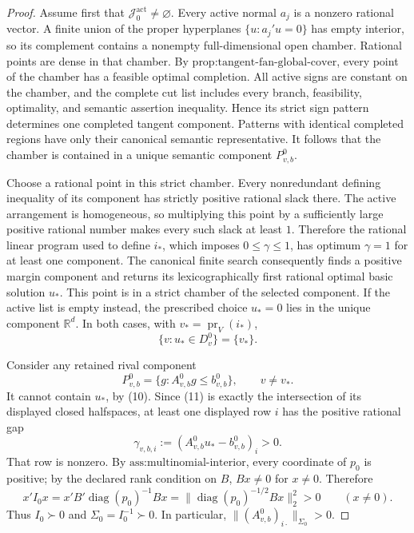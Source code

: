\documentclass{article}
\begin{document}
\begin{proof}
Assume first that
\(\mathcal J_0^{\mathrm{act}}\ne\varnothing\).  Every active normal
\(a_j\) is a nonzero rational vector.  A finite union of the proper
hyperplanes \(\{u:a_j'u=0\}\) has empty interior, so its complement
contains a nonempty full-dimensional open chamber.  Rational points
are dense in that chamber.  By
\(\text{prop:tangent-fan-global-cover}\), every point of the chamber
has a feasible optimal completion.  All active signs are constant on
the chamber, and the complete cut list includes every branch,
feasibility, optimality, and semantic assertion inequality.  Hence its
strict sign pattern determines one completed tangent component.
Patterns with identical completed regions have only their canonical
semantic representative.  It follows that the chamber is contained
in a unique semantic component \(P_{v,b}^0\).

Choose a rational point in this strict chamber.  Every nonredundant
defining inequality of its component has strictly positive rational
slack there.  The active arrangement is homogeneous, so multiplying
this point by a sufficiently large positive rational number makes
every such slack at least \(1\).  Therefore the rational linear
program used to define \(i_*\), which imposes
\(0\leq\gamma\leq1\), has optimum \(\gamma=1\) for at least one
component.  The canonical finite search consequently finds a positive
margin component and returns its lexicographically first rational
optimal basic solution \(u_*\).  This point is in a strict chamber of
the selected component.  If the active list is empty instead, the
prescribed choice \(u_*=0\) lies in the unique component
\(\mathbb R^d\).  In both cases, with
\(v_*=\operatorname{pr}_V(i_*)\),
\[
 \{v:u_*\in D_v^0\}=\{v_*\}.
\tag{10}
\]

Consider any retained rival component
\[
 P_{v,b}^0=\{g:A_{v,b}^0g\leq b_{v,b}^0\},
 \qquad v\ne v_*.
\tag{11}
\]
It cannot contain \(u_*\), by (10).  Since (11) is exactly the
intersection of its displayed closed halfspaces, at least one
displayed row \(i\) has the positive rational gap
\[
 \gamma_{v,b,i}
 :=(A_{v,b}^0u_*-b_{v,b}^0)_i>0.
\tag{12}
\]
That row is nonzero.  By \(\text{ass:multinomial-interior}\), every
coordinate of \(p_0\) is positive; by the declared rank condition on
\(B\), \(Bx\ne0\) for \(x\ne0\).  Therefore
\[
 x'I_0x
 =x'B'\operatorname{diag}(p_0)^{-1}Bx
 =\|\operatorname{diag}(p_0)^{-1/2}Bx\|_2^2>0
 \qquad(x\ne0).
\tag{13}
\]
Thus \(I_0\succ0\) and \(\Sigma_0=I_0^{-1}\succ0\).  In particular,
\(\|(A_{v,b}^0)_{i\cdot}\|_{\Sigma_0}>0\).


\end{proof}
\end{document}
